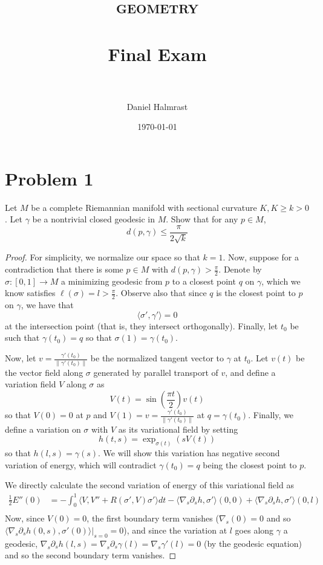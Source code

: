 \documentclass[fontsize=11pt]{scrartcl} %
\title{	
\normalfont \normalsize 
\textsc{geometry} \\ [25pt] %
\horrule{0.5pt} \\[0.4cm] %
\huge Final Exam \\ %
\horrule{2pt} \\[0.5cm] %
}
\author{Daniel Halmrast} %
\date{\normalsize\today} %
\numberwithin{equation}{section} %
\numberwithin{figure}{section} %
\numberwithin{table}{section} %
\begin{document}
\maketitle %

\section*{Problem 1}
Let $M$ be a complete Riemannian manifold with sectional curvature $K, K\geq
k>0$. Let $\gamma$ be a nontrivial closed geodesic in $M$. Show that for any
$p\in M$,
\[
    d(p,\gamma)\leq \frac{\pi}{2\sqrt{k}}
\]

\begin{proof}
    For simplicity, we normalize our space so that $k=1$. Now, suppose for a
    contradiction that there is some $p\in M$ with
    $d(p,\gamma)>\frac{\pi}{2}$. Denote by $\sigma:[0,1]\to M$ a minimizing geodesic from
    $p$ to a closest point $q$ on $\gamma$, which we know satisfies
    $\ell(\sigma)= l>\frac{\pi}{2}$. Observe also that since $q$ is the closest
    point to $p$ on $\gamma$, we have that
    \[
        \langle \sigma',\gamma'\rangle = 0
    \]
    at the intersection point (that is, they intersect orthogonally). Finally,
    let $t_0$ be such that $\gamma(t_0)=q$ so that $\sigma(1)=\gamma(t_0)$. 

    Now, let $v = \frac{\gamma'(t_0)}{\|\gamma'(t_0)\|}$ be the normalized
    tangent vector to $\gamma$ at $t_0$. Let $v(t)$ be the vector field along
    $\sigma$ generated by parallel transport of $v$, and define a variation
    field $V$ along $\sigma$ as
    \[
        V(t) = \sin(\frac{\pi t}{2})v(t)
    \]
    so that $V(0) = 0$ at $p$ and $V(1) = v =
    \frac{\gamma'(t_0)}{\|\gamma'(t_0)\|}$ at $q=\gamma(t_0)$. 
    Finally, we define a variation on $\sigma$ with $V$ as its variational field
    by setting
    \[
        h(t,s) = \exp_{\sigma(t)}(sV(t))
    \]
    so that $h(l,s) = \gamma(s)$. We will show this variation has negative second
    variation of energy, which will contradict $\gamma(t_0)=q$ being the closest
    point to $p$.

    We directly calculate the second variation of energy of this variational
    field as
    \[
\begin{aligned}
    \frac{1}{2}E''(0) &= -\int_0^1\langle V,V'' + R(\sigma',V)\sigma'\rangle dt -
    \langle \nabla_s\partial_s h ,\sigma'\rangle(0,0) + \langle
    \nabla_s\partial_s h,\sigma'\rangle(0,l)\\
\end{aligned}
    \]
    Now, since $V(0) = 0$, the first boundary term vanishes ($\nabla_s(0)=0$ and
    so $\langle \nabla_s\partial_sh(0,s),\sigma'(0)\rangle|_{s=0} = 0$), and since the
    variation at $l$ goes along $\gamma$ a geodesic, $\nabla_s\partial_sh(l,s) =
    \nabla_s\partial_s\gamma(l)= \nabla_s\gamma'(l) = 0$ (by the
    geodesic equation) and so the second boundary term vanishes.


\end{proof}
\end{document}
